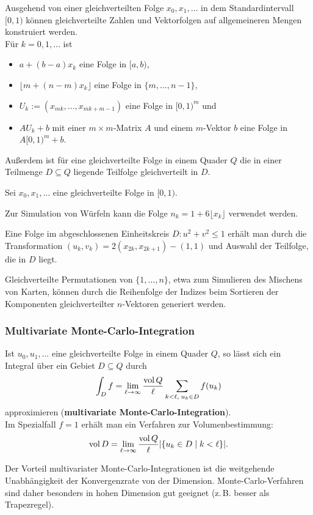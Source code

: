Ausgehend von einer gleichverteilten Folge $x_0, x_1, \dotsc$ in dem
Standardintervall $[0, 1)$ können gleichverteilte Zahlen und Vektorfolgen
auf allgemeineren Mengen konstruiert werden. \\
Für $k = 0, 1, \dotsc$ ist
\begin{itemize}
    \item
    $a + (b - a)x_k$ eine Folge in $[a, b)$,
    
    \item
    $\lfloor m + (n - m)x_k \rfloor$ eine Folge in $\{m, \dotsc, n - 1\}$,
    
    \item
    $U_k := (x_{mk}, \dotsc, x_{mk + m - 1})$ eine Folge in $[0, 1)^m$ und
    
    \item
    $A U_k + b$ mit einer $m \times m$-Matrix $A$ und einem $m$-Vektor $b$
    eine Folge in $A[0,1)^m + b$.
\end{itemize}
Außerdem ist für eine gleichverteilte Folge in einem Quader $Q$ die in einer
Teilmenge $D \subseteq Q$ liegende Teilfolge gleichverteilt in $D$.

\linie

Sei $x_0, x_1, \dotsc$ eine gleichverteilte Folge in $[0, 1)$.

Zur Simulation von Würfeln kann die Folge
$n_k = 1 + 6 \lfloor x_k \rfloor$ verwendet werden.

Eine Folge im abgeschlossenen Einheitskreis $D\colon u^2 + v^2 \le 1$
erhält man durch die Transformation $(u_k, v_k) = 2(x_{2k}, x_{2k+1}) - (1, 1)$
und Auswahl der Teilfolge, die in $D$ liegt.

Gleichverteilte Permutationen von $\{1, \dotsc, n\}$, etwa zum Simulieren
des Mischens von Karten, können durch die Reihenfolge der Indizes beim
Sortieren der Komponenten gleichverteilter $n$-Vektoren generiert werden.

\subsubsection{%
    Multivariate Monte-Carlo-Integration%
}

Ist $u_0, u_1, \dotsc$ eine gleichverteilte Folge in einem Quader $Q$, so lässt
sich ein Integral über ein Gebiet $D \subseteq Q$ durch
\begin{align*}
    \int_D f = \lim_{\ell \to \infty} \frac{\operatorname{vol} Q}{\ell}
    \sum_{k < \ell,\; u_k \in D} f(u_k)
\end{align*}
approximieren (\textbf{multivariate Monte-Carlo-Integration}). \\
Im Spezialfall $f = 1$ erhält man ein Verfahren zur Volumenbestimmung:
\begin{align*}
    \operatorname{vol} D = \lim_{\ell \to \infty} \frac{\operatorname{vol} Q}{\ell}
    |\{u_k \in D \;|\; k < \ell\}|.
\end{align*}

\linie

Der Vorteil multivariater Monte-Carlo-Integrationen ist die weitgehende
Unabhängigkeit der Konvergenzrate von der Dimension.
Monte-Carlo-Verfahren sind daher besonders in hohen Dimension gut geeignet
(z.\,B. besser als Trapezregel).

\pagebreak
